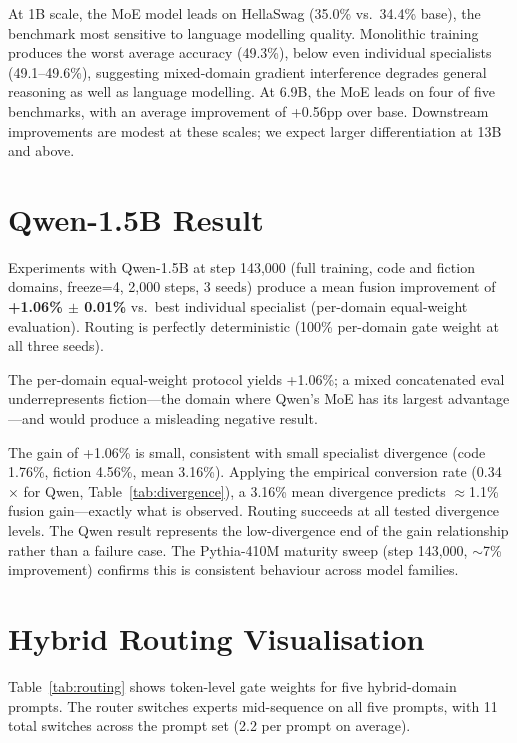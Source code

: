 \documentclass{article}
\begin{document}
At 1B scale, the MoE model leads on HellaSwag (35.0\% vs.\ 34.4\% base), the benchmark most sensitive to language modelling quality. Monolithic training produces the worst average accuracy (49.3\%), below even individual specialists (49.1--49.6\%), suggesting mixed-domain gradient interference degrades general reasoning as well as language modelling. At 6.9B, the MoE leads on four of five benchmarks, with an average improvement of +0.56pp over base. Downstream improvements are modest at these scales; we expect larger differentiation at 13B and above.

\section{Qwen-1.5B Result}
\label{app:qwen}

Experiments with Qwen-1.5B at step 143,000 (full training, code and fiction domains, freeze=4, 2,000 steps, 3 seeds) produce a mean fusion improvement of \textbf{+1.06\% $\pm$ 0.01\%} vs.\ best individual specialist (per-domain equal-weight evaluation). Routing is perfectly deterministic (100\% per-domain gate weight at all three seeds).

The per-domain equal-weight protocol yields +1.06\%; a mixed concatenated eval underrepresents fiction---the domain where Qwen's MoE has its largest advantage---and would produce a misleading negative result.

The gain of +1.06\% is small, consistent with small specialist divergence (code 1.76\%, fiction 4.56\%, mean 3.16\%). Applying the empirical conversion rate (0.34$\times$ for Qwen, Table~\ref{tab:divergence}), a 3.16\% mean divergence predicts $\approx$1.1\% fusion gain---exactly what is observed. Routing succeeds at all tested divergence levels. The Qwen result represents the low-divergence end of the gain relationship rather than a failure case. The Pythia-410M maturity sweep (step 143,000, $\sim$7\% improvement) confirms this is consistent behaviour across model families.

\section{Hybrid Routing Visualisation}
\label{app:routing}

Table~\ref{tab:routing} shows token-level gate weights for five hybrid-domain prompts. The router switches experts mid-sequence on all five prompts, with 11 total switches across the prompt set (2.2 per prompt on average).
\end{document}

